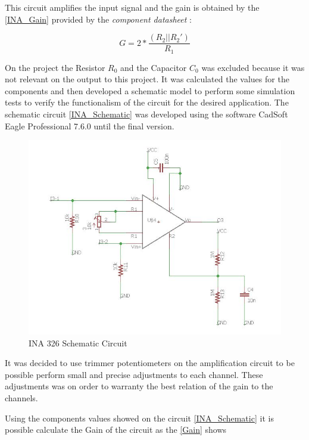 This circuit amplifies the input signal and the gain is obtained by the \autoref{INA_Gain} provided by the \textit{component datasheet}
\cite{INA326}:

\begin{equation}
\label{INA_Gain}
G=2*\frac{(R_2||R_2 ')}{R_1}
\end{equation}

On the project the Resistor $R_0$ and the Capacitor $C_0$ was excluded because
it was not relevant on the output to this project. It was calculated the values
for the components and then developed a schematic model to perform some simulation tests
to verify the functionalism of the circuit for the desired application.
The schematic circuit \autoref{INA_Schematic} was developed using the software CadSoft Eagle Professional 7.6.0
until the final version.

\begin{figure}[!htpb]
\centering
\caption{INA 326 Schematic Circuit}
\label{INA_Schematic}
\includegraphics[scale=0.65]{images/INA_Schematic}
\end{figure}

It was decided to use trimmer potentiometers on the amplification circuit to be possible perform small and precise adjustments to each
channel. These adjustments was on order to warranty the best relation of the gain to the channels.

Using the components values showed on the circuit \autoref{INA_Schematic} it is possible calculate
the Gain of the circuit as the \autoref{Gain} shows

